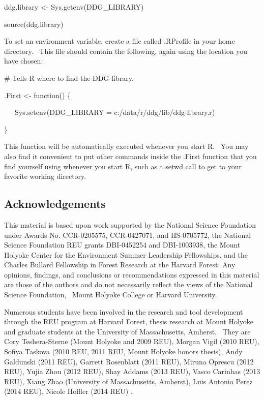 \documentclass[letterpaper]{article}
\begin{document}
{\color{black}
ddg.library {\textless}- Sys.getenv(\textcolor[rgb]{0.24705882,0.24705882,0.6862745}{{\textquotedbl}DDG\_LIBRARY{\textquotedbl}})}

{\mdseries\upshape\color{black}
source(ddg.library)}

{\mdseries\upshape\color{black}
To set an environment variable, create a file called .RProfile in your home directory. \ This file should contain the following, again using the location you have chosen:}

{\color{black}
\# Tells R where to find the DDG library.}

{\mdseries\upshape\color{black}
.First {\textless}- function() \{}

{\mdseries\upshape\color{black}
\ \ \ Sys.setenv(DDG\_LIBRARY = {\textquotedbl}c:/data/r/ddg/lib/ddg-library.r{\textquotedbl})}

{\mdseries\upshape\color{black}
\}}

{\mdseries\upshape\color{black}
This function will be automatically executed whenever you start R. \ You may also find it convenient to put other commands inside the .First function that you find yourself using whenever you start R, such as a setwd call to get to your favorite working directory. }

\subsection[Acknowledgements]{Acknowledgements}
{\mdseries\upshape\color{black}
This material is based upon work supported by the National Science Foundation under Awards No. CCR-0205575, CCR-0427071, and IIS-0705772, the National Science Foundation REU grants DBI-0452254 and DBI-1003938, the Mount Holyoke Center for the Environment Summer Leadership Fellowships, and the Charles Bullard Fellowship in Forest Research at the Harvard Forest. Any opinions, findings, and conclusions or recommendations expressed in this material are those of the authors and do not necessarily reflect the views of the National Science Foundation, \ Mount Holyoke College or Harvard University.}

{\mdseries\upshape\color{black}
Numerous students have been involved in the research and tool development through the REU program at Harvard Forest, thesis research at Mount Holyoke and graduate students at the University of Massachusetts, Amherst. \ They are Cory Teshera-Sterne (Mount Holyoke and 2009 REU), Morgan Vigil (2010 REU), Sofiya Taskova (2010 REU, 2011 REU, Mount Holyoke honors thesis), Andy Galdunski (2011 REU), Garrett Rosenblatt (2011 REU), Miruna Oprescu (2012 REU), Yujia Zhou (2012 REU), Shay Addams (2013 REU), Vasco Carinhas (2013 REU), Xiang Zhao (University of Massachusetts, Amherst), Luis Antonio Perez (2014 REU), Nicole Hoffler (2014 REU) .}
\end{document}
